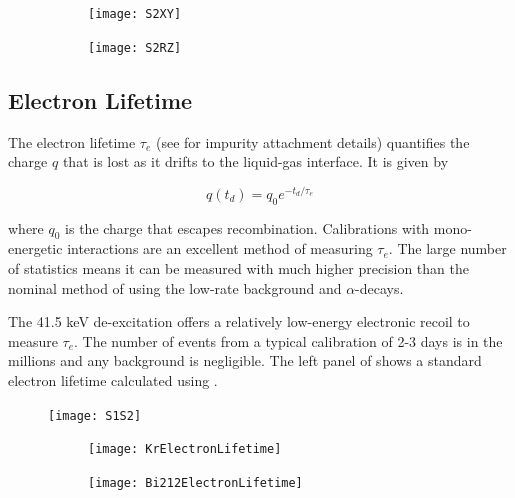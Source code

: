 \begin{figure}
    \centering
    \begin{subfigure}[t]{0.45\textwidth}
        \centering
        \texttt{[image: S2XY]}
    \end{subfigure}%
    \begin{subfigure}[t]{0.45\textwidth}
        \centering
        \texttt{[image: S2RZ]}
    \end{subfigure}
    \caption{}
	\label{fig:calibrations_position_reconstruction}
\end{figure}



\subsection{Electron Lifetime}
\label{subsec:calibrations_elifetime}
The electron lifetime $\tau_e$ (see  for impurity attachment details) quantifies the charge $q$ that
is lost as it drifts to the liquid-gas interface.  It is given by

\begin{equation}
q(t_d) = q_0 e^{-t_d / \tau_e}
\end{equation}

where $q_0$ is the charge that escapes recombination.  Calibrations with mono-energetic interactions are an excellent method of
measuring $\tau_e$.  The large number of statistics means it can be measured with much higher precision than the
nominal method of using the low-rate background  and  $\alpha$-decays.

The 41.5 keV  de-excitation offers a relatively low-energy electronic recoil to measure $\tau_e$.  The number of events
from a typical calibration of 2-3 days is in the millions and any background is negligible.  The left panel of
 shows a standard electron lifetime calculated using .

\begin{figure}
\centering
\texttt{[image: S1S2]}
\label{fig:calibrations_kr_s1_s2}
\end{figure}

\begin{figure}
    \centering
    \begin{subfigure}[t]{0.45\textwidth}
        \centering
        \texttt{[image: KrElectronLifetime]}
    \end{subfigure}%
    \begin{subfigure}[t]{0.45\textwidth}
        \centering
        \texttt{[image: Bi212ElectronLifetime]}
    \end{subfigure}
    \caption{}
	\label{fig:calibrations_elifetime}
\end{figure}

